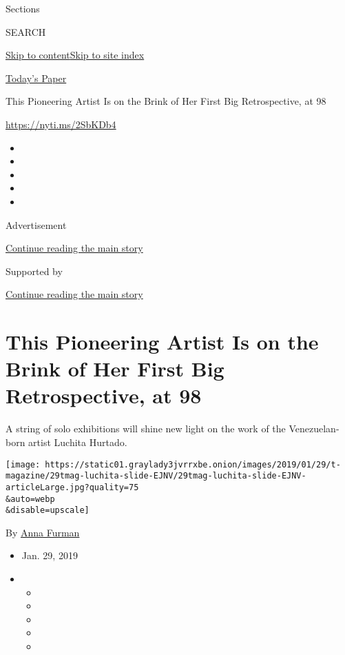 Sections

SEARCH

\protect\hyperlink{site-content}{Skip to
content}\protect\hyperlink{site-index}{Skip to site index}

\href{https://myaccount.nytimes3xbfgragh.onion/auth/login?response_type=cookie\&client_id=vi}{}

\href{https://www.nytimes3xbfgragh.onion/section/todayspaper}{Today's
Paper}

This Pioneering Artist Is on the Brink of Her First Big Retrospective,
at 98

\url{https://nyti.ms/2SbKDb4}

\begin{itemize}
\item
\item
\item
\item
\item
\end{itemize}

Advertisement

\protect\hyperlink{after-top}{Continue reading the main story}

Supported by

\protect\hyperlink{after-sponsor}{Continue reading the main story}

\hypertarget{this-pioneering-artist-is-on-the-brink-of-her-first-big-retrospective-at-98}{%
\section{This Pioneering Artist Is on the Brink of Her First Big
Retrospective, at
98}\label{this-pioneering-artist-is-on-the-brink-of-her-first-big-retrospective-at-98}}

A string of solo exhibitions will shine new light on the work of the
Venezuelan-born artist Luchita Hurtado.

\texttt{[image: https://static01.graylady3jvrrxbe.onion/images/2019/01/29/t-magazine/29tmag-luchita-slide-EJNV/29tmag-luchita-slide-EJNV-articleLarge.jpg?quality=75\\\&auto=webp\\\&disable=upscale]}

By \href{https://www.nytimes3xbfgragh.onion/by/anna-furman}{Anna Furman}

\begin{itemize}
\item
  Jan. 29, 2019
\item
  \begin{itemize}
  \item
  \item
  \item
  \item
  \item
  \end{itemize}
\end{itemize}


